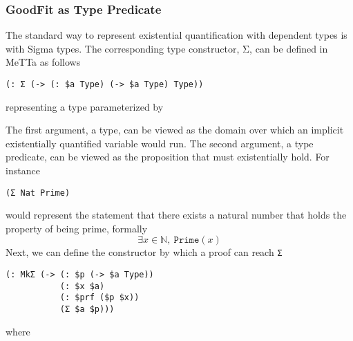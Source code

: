\documentclass[]{report}
\begin{document}
\subsubsection{GoodFit as Type Predicate}

The standard way to represent existential quantification with
dependent types is with Sigma types.  The corresponding type
constructor, Σ, can be defined in MeTTa as follows
\begin{verbatim}
(: Σ (-> (: $a Type) (-> $a Type) Type))
\end{verbatim}
representing a type parameterized by
The first argument, a type, can be viewed as the domain over which an
implicit existentially quantified variable would run.  The second
argument, a type predicate, can be viewed as the proposition that must
existentially hold.  For instance
\begin{verbatim}
(Σ Nat Prime)
\end{verbatim}
would represent the statement that there exists a natural number that
holds the property of being prime, formally
$$\exists x\in\mathbb{N},\ \texttt{Prime}(x)$$ Next, we can define the
constructor by which a proof can reach \texttt{Σ}
\begin{verbatim}
(: MkΣ (-> (: $p (-> $a Type))
           (: $x $a)
           (: $prf ($p $x))
           (Σ $a $p)))
\end{verbatim}
where
\end{document}
